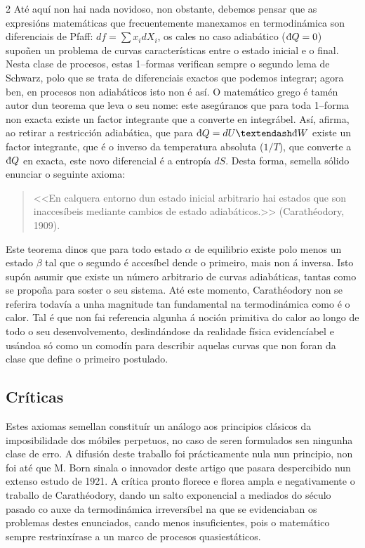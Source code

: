 \begin{refsection}
\begin{multicols}{2}
Até aquí non hai nada novidoso, non obstante, debemos pensar que as expresións
matemáticas que frecuentemente manexamos en termodinámica son diferenciais de
Pfaff: $df=\sum x_i dX_i$, os cales no caso adiabático ($\dbar Q = 0$) supoñen
un problema de curvas características entre o estado inicial e o final. Nesta
clase de procesos, estas 1–formas verifican sempre o segundo lema de Schwarz,
polo que se trata de diferenciais exactos que podemos integrar; agora ben, en
procesos non adiabáticos isto non é así. O matemático grego é tamén autor dun
teorema que leva o seu nome: este asegúranos que para toda 1–forma non exacta
existe un factor integrante que a converte en integrábel. Así, afirma, ao
retirar a restricción adiabática, que para $\dbar Q = dU – \dbar W$ existe un
factor integrante, que é o inverso da temperatura absoluta ($1/T$), que
converte a $\dbar Q$ en exacta, este novo diferencial é a entropía $dS$. Desta
forma, semella sólido enunciar o seguinte axioma:

\begin{quotation}
<<En calquera entorno dun estado inicial arbitrario hai estados que son
inaccesíbeis mediante cambios de estado adiabáticos.>> (Carathéodory, 1909).
\end{quotation}

Este teorema dinos que para todo estado $\alpha$ de equilibrio existe polo
menos un estado $\beta$ tal que o segundo é accesíbel dende o primeiro, mais
non á inversa. Isto supón asumir que existe un número arbitrario de curvas
adiabáticas, tantas como se propoña para soster o seu sistema. Até este
momento, Carathéodory non se referira todavía a unha magnitude tan fundamental
na termodinámica como é o calor. Tal é que non fai referencia algunha á noción
primitiva do calor ao longo de todo o seu desenvolvemento, deslindándose da
realidade física evidencíabel e usándoa só como un comodín para describir
aquelas curvas que non foran da clase que define o primeiro postulado.

\subsection*{Críticas}

Estes axiomas semellan constituír un análogo aos principios clásicos da
imposibilidade dos móbiles perpetuos, no caso de seren formulados sen ningunha
clase de erro. A difusión deste traballo foi prácticamente nula nun principio,
non foi até que M. Born sinala o innovador deste artigo que pasara despercibido
nun extenso estudo de 1921. A crítica pronto florece e florea ampla e
negativamente o traballo de Carathéodory, dando un salto exponencial a mediados
do século pasado co auxe da termodinámica irreversíbel na que se evidenciaban
os problemas destes enunciados, cando menos insuficientes, pois o matemático
sempre restrinxírase a un marco de procesos quasiestáticos.


\end{multicols}
\end{refsection}
